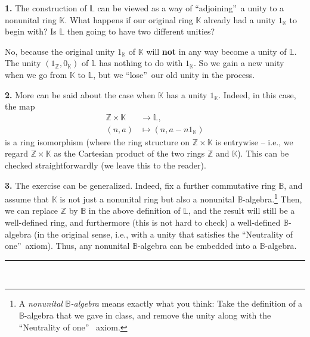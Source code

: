 \documentclass[paper=a4, fontsize=12pt]{scrartcl}%
\theoremstyle{plainsl}
\theoremstyle{definition}
\theoremstyle{remark}
\begin{document}
\textbf{1.} The construction of $\mathbb{L}$ can be viewed as a way of
\textquotedblleft adjoining\textquotedblright\ a unity to a nonunital ring
$\mathbb{K}$. What happens if our original ring $\mathbb{K}$ already had a
unity $1_{\mathbb{K}}$ to begin with? Is $\mathbb{L}$ then going to have two
different unities?

No, because the original unity $1_{\mathbb{K}}$ of $\mathbb{K}$ will
\textbf{not} in any way become a unity of $\mathbb{L}$. The unity $\left(
1_{\mathbb{Z}},0_{\mathbb{K}}\right)  $ of $\mathbb{L}$ has nothing to do with
$1_{\mathbb{K}}$. So we gain a new unity when we go from $\mathbb{K}$ to
$\mathbb{L}$, but we \textquotedblleft lose\textquotedblright\ our old unity
in the process.

\bigskip

\textbf{2.} More can be said about the case when $\mathbb{K}$ has a unity
$1_{\mathbb{K}}$. Indeed, in this case, the map%
\begin{align*}
\mathbb{Z}\times\mathbb{K}  &  \rightarrow\mathbb{L},\\
\left(  n,a\right)   &  \mapsto\left(  n,a-n1_{\mathbb{K}}\right)
\end{align*}
is a ring isomorphism (where the ring structure on $\mathbb{Z}\times
\mathbb{K}$ is entrywise -- i.e., we regard $\mathbb{Z}\times\mathbb{K}$ as
the Cartesian product of the two rings $\mathbb{Z}$ and $\mathbb{K}$). This
can be checked straightforwardly (we leave this to the reader).

\bigskip

\textbf{3.} The exercise can be generalized. Indeed, fix a further commutative
ring $\mathbb{B}$, and assume that $\mathbb{K}$ is not just a nonunital ring
but also a nonunital $\mathbb{B}$-algebra.\footnote{A \textit{nonunital
}$\mathbb{B}$\textit{-algebra} means exactly what you think: Take the
definition of a $\mathbb{B}$-algebra that we gave in class, and remove the
unity along with the \textquotedblleft Neutrality of one\textquotedblright%
\ axiom.} Then, we can replace $\mathbb{Z}$ by $\mathbb{B}$ in the above
definition of $\mathbb{L}$, and the result will still be a well-defined ring,
and furthermore (this is not hard to check) a well-defined $\mathbb{B}%
$-algebra (in the original sense, i.e., with a unity that satisfies the
\textquotedblleft Neutrality of one\textquotedblright\ axiom). Thus, any
nonunital $\mathbb{B}$-algebra can be embedded into a $\mathbb{B}$-algebra.

\rule{\linewidth}{0.3pt} \\[0.4cm]
\end{document}
